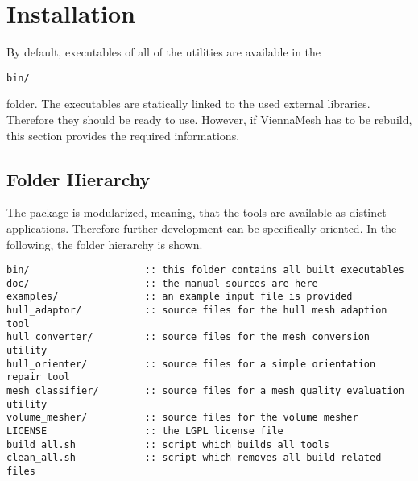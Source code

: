 \section{Installation}

By default, executables of all of the utilities are available in the 

\begin{exaipd}
\begin{Verbatim}
bin/ 
\end{Verbatim}
\end{exaipd}

folder. The executables are statically linked to the used external libraries. 
Therefore they should be ready to use.
However, if ViennaMesh has to be rebuild, this section provides the required 
informations.

\subsection{Folder Hierarchy}
The package is modularized, meaning, that the tools are available as 
distinct applications. Therefore further development can be specifically 
oriented. In the following, the folder hierarchy is shown.

\begin{exaipd}
\begin{Verbatim}
bin/                    :: this folder contains all built executables
doc/                    :: the manual sources are here
examples/               :: an example input file is provided
hull_adaptor/           :: source files for the hull mesh adaption tool
hull_converter/         :: source files for the mesh conversion utility
hull_orienter/          :: source files for a simple orientation repair tool
mesh_classifier/        :: source files for a mesh quality evaluation utility
volume_mesher/          :: source files for the volume mesher
LICENSE                 :: the LGPL license file
build_all.sh            :: script which builds all tools 
clean_all.sh            :: script which removes all build related files
\end{Verbatim}
\end{exaipd}

